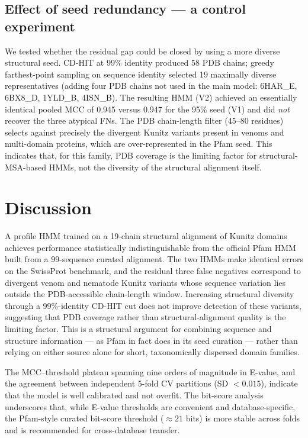 \documentclass[11pt,a4paper]{article}
\begin{document}
\subsection{Effect of seed redundancy --- a control experiment}
\label{sec:control}
We tested whether the residual gap could be closed by using a more diverse structural seed. CD-HIT at 99\% identity produced 58 PDB chains; greedy farthest-point sampling on sequence identity selected 19 maximally diverse representatives (adding four PDB chains not used in the main model: 6HAR\_E, 6BX8\_D, 1YLD\_B, 4ISN\_B). The resulting HMM (\textsc{V2}) achieved an essentially identical pooled MCC of 0.945 versus 0.947 for the 95\% seed (\textsc{V1}) and did \emph{not} recover the three atypical FNs. The PDB chain-length filter (45--80 residues) selects against precisely the divergent Kunitz variants present in venoms and multi-domain proteins, which are over-represented in the Pfam seed. This indicates that, for this family, PDB coverage is the limiting factor for structural-MSA-based HMMs, not the diversity of the structural alignment itself.

\section{Discussion}
A profile HMM trained on a 19-chain structural alignment of Kunitz domains achieves performance statistically indistinguishable from the official Pfam HMM built from a 99-sequence curated alignment. The two HMMs make identical errors on the SwissProt benchmark, and the residual three false negatives correspond to divergent venom and nematode Kunitz variants whose sequence variation lies outside the PDB-accessible chain-length window. Increasing structural diversity through a 99\%-identity CD-HIT cut does not improve detection of these variants, suggesting that PDB coverage rather than structural-alignment quality is the limiting factor. This is a structural argument for combining sequence and structure information --- as Pfam in fact does in its seed curation --- rather than relying on either source alone for short, taxonomically dispersed domain families.

The MCC--threshold plateau spanning nine orders of magnitude in E-value, and the agreement between independent 5-fold CV partitions (SD $< 0.015$), indicate that the model is well calibrated and not overfit. The bit-score analysis underscores that, while E-value thresholds are convenient and database-specific, the Pfam-style curated bit-score threshold ($\approx 21$ bits) is more stable across folds and is recommended for cross-database transfer.
\end{document}
